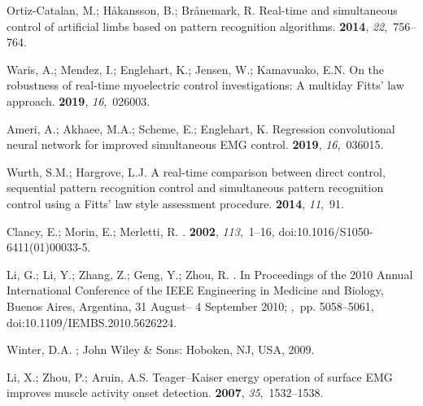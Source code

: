 \documentclass[sensors,review,accept,moreauthors,pdftex]{Definitions/mdpi}
\begin{document}
\begin{thebibliography}{999}
Ortiz-Catalan, M.; H{\aa}kansson, B.; Br{\aa}nemark, R.
\newblock Real-time and simultaneous control of artificial limbs based on
  pattern recognition algorithms.
 {\bf 2014}, {\em 22},~756--764.

Waris, A.; Mendez, I.; Englehart, K.; Jensen, W.; Kamavuako, E.N.
\newblock On the robustness of real-time myoelectric control investigations: A
  multiday Fitts’ law approach.
 {\bf 2019}, {\em 16},~026003.

Ameri, A.; Akhaee, M.A.; Scheme, E.; Englehart, K.
\newblock Regression convolutional neural network for improved simultaneous EMG
  control.
 {\bf 2019}, {\em 16},~036015.

Wurth, S.M.; Hargrove, L.J.
\newblock A real-time comparison between direct control, sequential pattern
  recognition control and simultaneous pattern recognition control using a
  Fitts’ law style assessment procedure.
 {\bf 2014}, {\em
  11},~91.

Clancy, E.; Morin, E.; Merletti, R.
.
 {\bf 2002}, {\em
  113},~1--16, doi:10.1016/S1050-6411(01)00033-5.

Li, G.; Li, Y.; Zhang, Z.; Geng, Y.; Zhou, R.
. In {Proceedings of the  2010 Annual International Conference of the IEEE Engineering in Medicine and Biology,} Buenos Aires, Argentina, 31 August-- 4 September 2010;
,~pp. 5058--5061, doi:10.1109/IEMBS.2010.5626224.

Winter, D.A.
;  John Wiley \& Sons:  Hoboken, NJ, USA,  2009.

Li, X.; Zhou, P.; Aruin, A.S.
\newblock Teager--Kaiser energy operation of surface EMG improves muscle
  activity onset detection.
 {\bf 2007}, {\em
  35},~1532--1538.


\end{thebibliography}
\end{document}
